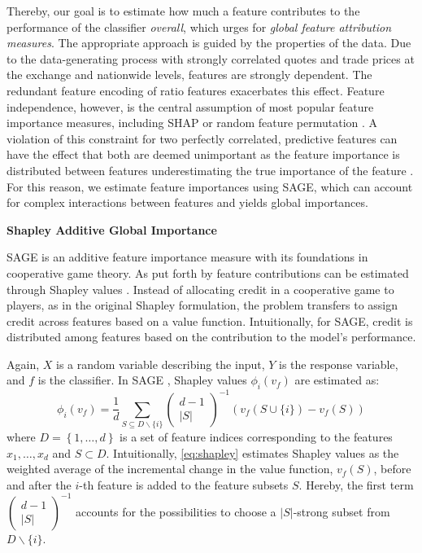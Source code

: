 Thereby, our goal is to estimate how much a feature contributes to the performance of the classifier \emph{overall}, which urges for \emph{global feature attribution measures}. The appropriate approach is guided by the properties of the data. Due to the data-generating process with strongly correlated quotes and trade prices at the exchange and nationwide levels, features are strongly dependent. The redundant feature encoding of ratio features exacerbates this effect. Feature independence, however, is the central assumption of most popular feature importance measures, including \gls{SHAP} or random feature permutation \autocite[][2]{aasExplainingIndividualPredictions2021}. A violation of this constraint for two perfectly correlated, predictive features can have the effect that both are deemed unimportant as the feature importance is distributed between features underestimating the true importance of the feature \autocite[][17215]{covertUnderstandingGlobalFeature2020}. For this reason, we estimate feature importances using \gls{SAGE}, which can account for complex interactions between features and yields global importances. 

\textbf{Shapley Additive Global Importance}

\gls{SAGE} is an additive feature importance measure with its foundations in cooperative game theory. As put forth by \textcite[][4770]{lundbergUnifiedApproachInterpreting2017} feature contributions can be estimated through Shapley values \autocite[][310--312]{shapleyValueNpersonGames1953}. Instead of allocating credit in a cooperative game to players, as in the original Shapley formulation, the problem transfers to assign credit across features based on a value function. Intuitionally, for \gls{SAGE}, credit is distributed among features based on the contribution to the model's performance.

Again, $X$ is a random variable describing the input, $Y$ is the response variable, and $f$ is the classifier. In \gls{SAGE} \autocite[][17215--17216]{covertUnderstandingGlobalFeature2020}, Shapley values $\phi_i(v_f)$ are estimated as:
\begin{equation}
    \phi_i(v_f)=\frac{1}{d} \sum_{S \subseteq D \backslash\{i\}}\left(\begin{array}{c}
        d-1 \\
        |S|
        \end{array}\right)^{-1}(v_f(S \cup\{i\})-v_f(S))
        \label{eq:shapley}
\end{equation}
where $D=\left\{1,\ldots,d\right\}$ is a set of feature indices corresponding to the features $x_1,\ldots,x_d$ and $S\subset D$. Intuitionally, \cref{eq:shapley} estimates Shapley values as the weighted average of the incremental change in the value function, $v_f(S)$, before and after the $i$-th feature is added to the feature subsets $S$. Hereby, the first term $\left(\begin{smallmatrix} d-1 \\|S|\end{smallmatrix}\right)^{-1}$ accounts for the possibilities to choose a $|S|$-strong subset from $D \backslash\{i\}$. 


